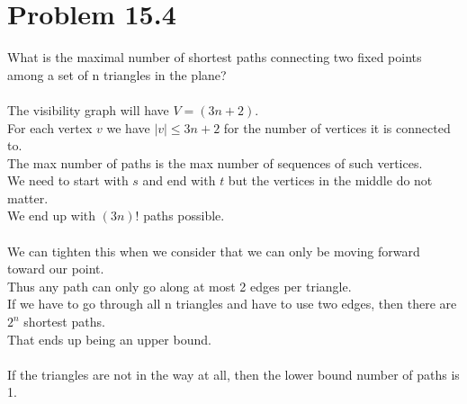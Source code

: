 \documentclass[11pt,psfig]{article}
\begin{document}
\newpage

\section*{Problem 15.4}

What is the maximal number of shortest paths connecting two ﬁxed
points among a set of n triangles in the plane?\\
\\
The visibility graph will have $V = (3n+2)$.\\
For each vertex $v$ we have $|v| \leq 3n + 2$ for the number of vertices it is connected to. \\
The max number of paths is the max number of sequences of such vertices. \\
We need to start with $s$ and end with $t$ but the vertices in the middle do not matter. \\
We end up with $(3n)!$ paths possible. \\
\\
We can tighten this when we consider that we can only be moving forward toward our point. \\
Thus any path can only go along at most 2 edges per triangle. \\
If we have to go through all n triangles and have to use two edges, then there are $2^n$ shortest paths. \\
That ends up being an upper bound. \\
\\
If the triangles are not in the way at all, then the lower bound number of paths is 1. \\
\\
\end{document}
